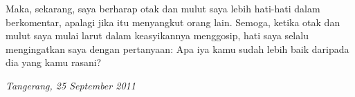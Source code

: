 Maka, sekarang, saya berharap otak dan mulut saya lebih hati-hati dalam berkomentar, apalagi jika itu menyangkut orang lain. Semoga, ketika otak dan mulut saya mulai larut dalam keasyikannya menggosip, hati saya selalu mengingatkan saya dengan pertanyaan: Apa iya kamu sudah lebih baik daripada dia yang kamu rasani?


\begin{flushright}\textit{Tangerang, 25 September 2011} \end{flushright}
\normalsize



